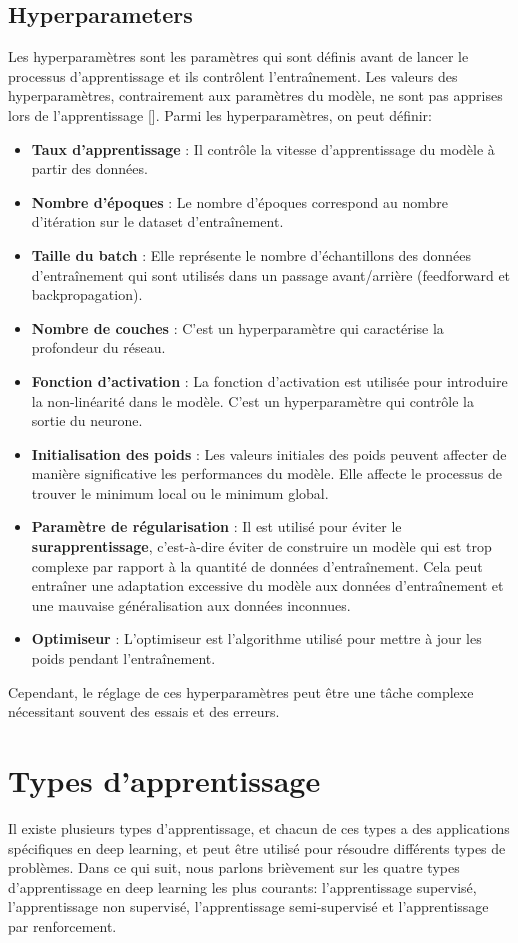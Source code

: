 \subsection{Hyperparameters}
Les hyperparamètres sont les paramètres qui sont définis avant de lancer le
processus d'apprentissage et ils contrôlent l'entraînement. Les valeurs des
hyperparamètres, contrairement aux paramètres du modèle, ne sont pas apprises
lors de l'apprentissage [\cite{Goodfellow-et-al-2016}]. Parmi les
hyperparamètres, on peut définir:
\begin{itemize}
	\item \textbf{Taux d'apprentissage} : Il contrôle la vitesse d'apprentissage du modèle à partir des données.
	\item \textbf{Nombre d'époques} : Le nombre d'époques correspond au nombre d'itération sur le dataset d'entraînement.
	\item \textbf{Taille du batch} : Elle représente le nombre d'échantillons des données d'entraînement qui sont utilisés dans un passage avant/arrière (feedforward et backpropagation).
	\item \textbf{Nombre de couches} : C'est un hyperparamètre qui caractérise la profondeur du réseau.
	\item \textbf{Fonction d'activation} : La fonction d'activation est utilisée pour introduire la non-linéarité dans le modèle. C'est un hyperparamètre qui contrôle la sortie du neurone.
	\item \textbf{Initialisation des poids} : Les valeurs initiales des poids peuvent affecter de manière significative les performances du modèle. Elle affecte le processus de trouver le minimum local ou le minimum global.
	\item \textbf{Paramètre de régularisation} : Il est utilisé pour éviter le \textbf{surapprentissage}, c'est-à-dire éviter de construire un modèle qui est trop complexe par rapport à la quantité de données d'entraînement. Cela peut entraîner une adaptation excessive du modèle aux données d'entraînement et une mauvaise généralisation aux données inconnues.
	\item \textbf{Optimiseur} : L'optimiseur est l'algorithme utilisé pour mettre à jour les poids pendant l'entraînement.
\end{itemize}

Cependant, le réglage de ces hyperparamètres peut être une tâche complexe
nécessitant souvent des essais et des erreurs.

\section{Types d’apprentissage}
Il existe plusieurs types d’apprentissage, et chacun de ces types a des
applications spécifiques en deep learning, et peut être utilisé pour résoudre
différents types de problèmes. Dans ce qui suit, nous parlons brièvement sur
les quatre types d'apprentissage en deep learning les plus courants:
l'apprentissage supervisé, l'apprentissage non supervisé, l'apprentissage
semi-supervisé et l'apprentissage par renforcement.

